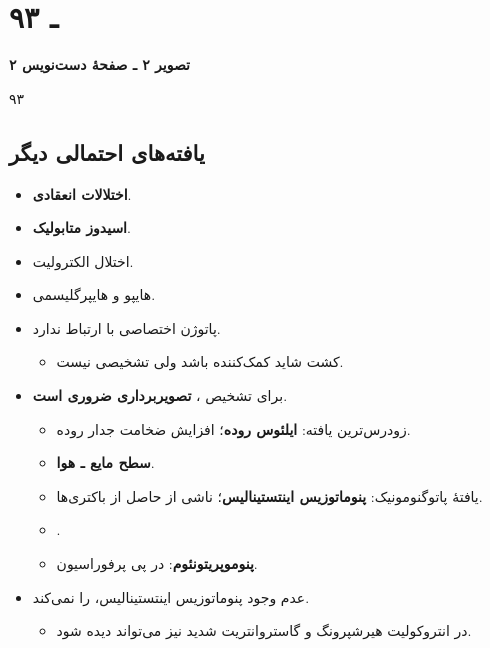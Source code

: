 \documentclass[12pt,a4paper]{article}
\begin{document}
\clearpage
\section*{۹۳ ـ }
\noindent\textbf{تصویر ۲ ـ صفحهٔ دست‌نویس ۲}\par
{\footnotesize{}\quad ۹۳\par
{}\par}

\subsection*{یافته‌های احتمالی دیگر}
\begin{itemize}
\item \textbf{اختلالات انعقادی}.
\item \textbf{اسیدوز متابولیک}.
\item اختلال الکترولیت.
\item هایپو و هایپرگلیسمی.
\end{itemize}

\begin{itemize}
\item پاتوژن اختصاصی با  ارتباط ندارد.
  \begin{itemize}
  \item کشت شاید کمک‌کننده باشد ولی تشخیصی نیست.
  \end{itemize}
\item برای تشخیص ، \textbf{تصویر‌برداری ضروری است}.
  \begin{itemize}
  \item زودرس‌ترین یافته: \textbf{ایلئوس روده}؛ افزایش ضخامت جدار روده.
  \item \textbf{سطح مایع ـ هوا}.
  \item یافتهٔ پاتوگنومونیک: \textbf{پنوماتوزیس اینتستینالیس}؛ ناشی از  حاصل از باکتری‌ها.
  \item \textbf{}.
  \item \textbf{پنوموپریتونئوم}: در پی پرفوراسیون.
  \end{itemize}
\item عدم وجود پنوماتوزیس اینتستینالیس،  را  نمی‌کند.
  \begin{itemize}
  \item در انتروکولیت هیرشپرونگ و گاستروانتریت شدید نیز می‌تواند دیده شود.
  \end{itemize}
\end{itemize}
\end{document}
